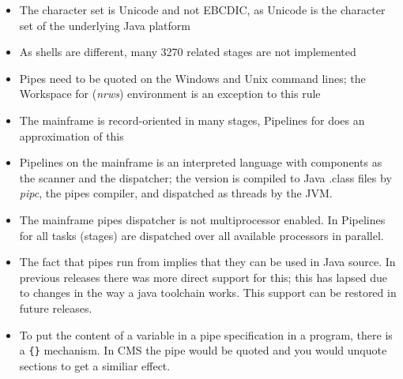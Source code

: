 \begin{itemize}
\item The character set is Unicode and not EBCDIC, as Unicode is the
  character set of the underlying Java platform
\item As shells are different, many 3270 related stages are not
  implemented
 \item Pipes need to be quoted on the Windows and Unix command lines;
   the Workspace for \nr{} (\emph{nrws}) environment is an exception to this rule
\item The mainframe is record-oriented in many stages, Pipelines for \nr{} does
  an approximation of this
\item Pipelines on the mainframe is an interpreted language with
  components as the scanner and the dispatcher; the \nr{}
  version is compiled to Java .class files by \emph{pipc}, the pipes
  compiler, and dispatched as threads by the JVM.
\item The mainframe pipes dispatcher is not multiprocessor enabled. In
  Pipelines for \nr{} all tasks (stages) are dispatched over all available
  processors in parallel.
  \item The fact that pipes run from \nr{} implies that they can be
    used in Java source. In previous releases there was more direct
    support for this; this has lapsed due to changes in the way a java
    toolchain works. This support can be restored in future releases.
  \item To put the content of  a \nr{} variable in a pipe
    specification in a \nr{} program, there is a \texttt{\{\}} mechanism. In CMS the pipe would be quoted and you would unquote sections to get a similiar effect.
\end{itemize}



 
